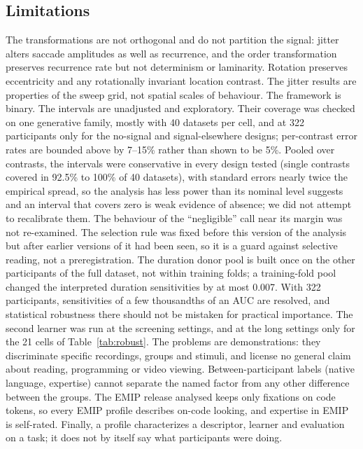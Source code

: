 \documentclass[11pt]{article}
\begin{document}
\subsection{Limitations}
The transformations are not orthogonal and do not partition the signal: jitter alters saccade amplitudes as well as recurrence, and the order transformation preserves recurrence rate but not determinism or laminarity. Rotation preserves eccentricity and any rotationally invariant location contrast. The jitter results are properties of the sweep grid, not spatial scales of behaviour. The framework is binary. The intervals are unadjusted and exploratory. Their coverage was checked on one generative family, mostly with 40 datasets per cell, and at 322 participants only for the no-signal and signal-elsewhere designs; per-contrast error rates are bounded above by 7--15\% rather than shown to be 5\%. Pooled over contrasts, the intervals were conservative in every design tested (single contrasts covered in 92.5\% to 100\% of 40 datasets), with standard errors nearly twice the empirical spread, so the analysis has less power than its nominal level suggests and an interval that covers zero is weak evidence of absence; we did not attempt to recalibrate them. The behaviour of the ``negligible'' call near its margin was not re-examined. The selection rule was fixed before this version of the analysis but after earlier versions of it had been seen, so it is a guard against selective reading, not a preregistration. The duration donor pool is built once on the other participants of the full dataset, not within training folds; a training-fold pool changed the interpreted duration sensitivities by at most 0.007. With 322 participants, sensitivities of a few thousandths of an AUC are resolved, and statistical robustness there should not be mistaken for practical importance. The second learner was run at the screening settings, and at the long settings only for the 21 cells of Table~\ref{tab:robust}. The problems are demonstrations: they discriminate specific recordings, groups and stimuli, and license no general claim about reading, programming or video viewing. Between-participant labels (native language, expertise) cannot separate the named factor from any other difference between the groups. The EMIP release analysed keeps only fixations on code tokens, so every EMIP profile describes on-code looking, and expertise in EMIP is self-rated. Finally, a profile characterizes a descriptor, learner and evaluation on a task; it does not by itself say what participants were doing.
\end{document}
